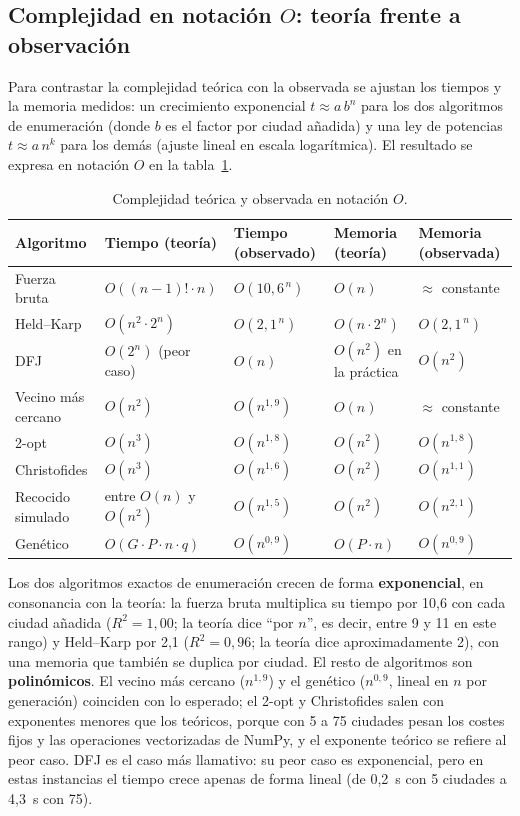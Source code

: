 \subsection{Complejidad en notación $O$: teoría frente a observación}

Para contrastar la complejidad teórica con la observada se ajustan los tiempos y la memoria medidos: un crecimiento exponencial $t\approx a\,b^{n}$ para los dos algoritmos de enumeración (donde $b$ es el factor por ciudad añadida) y una ley de potencias $t\approx a\,n^{k}$ para los demás
(ajuste lineal en escala logarítmica). El resultado se expresa en notación $O$ en la tabla~\ref{tab:bigo}.

\begin{table}[htbp]
  \centering
  \caption{Complejidad teórica y observada en notación $O$.}\label{tab:bigo}
  \footnotesize
  \begin{tabularx}{\linewidth}{@{}l X l X l@{}}
    \toprule
    Algoritmo & Tiempo (teoría) & Tiempo (observado) & Memoria (teoría) & Memoria (observada) \\
    \midrule
    Fuerza bruta & $O((n-1)!\cdot n)$ & $O(10{,}6^{\,n})$ & $O(n)$ & $\approx$ constante \\
    Held--Karp & $O(n^2\cdot 2^n)$ & $O(2{,}1^{\,n})$ & $O(n\cdot 2^n)$ & $O(2{,}1^{\,n})$ \\
    DFJ & $O(2^n)$ (peor caso) & $O(n)$ & $O(n^2)$ en la práctica & $O(n^{2})$ \\
    Vecino más cercano & $O(n^2)$ & $O(n^{1{,}9})$ & $O(n)$ & $\approx$ constante \\
    2-opt & $O(n^3)$ & $O(n^{1{,}8})$ & $O(n^2)$ & $O(n^{1{,}8})$ \\
    Christofides & $O(n^3)$ & $O(n^{1{,}6})$ & $O(n^2)$ & $O(n^{1{,}1})$ \\
    Recocido simulado & entre $O(n)$ y $O(n^2)$ & $O(n^{1{,}5})$ & $O(n^2)$ & $O(n^{2{,}1})$ \\
    Genético & $O(G\cdot P\cdot n\cdot q)$ & $O(n^{0{,}9})$ & $O(P\cdot n)$ & $O(n^{0{,}9})$ \\
    \bottomrule
  \end{tabularx}
\end{table}

Los dos algoritmos exactos de enumeración crecen de forma \textbf{exponencial}, en consonancia con la teoría: la fuerza bruta multiplica su tiempo por 10,6 con cada ciudad añadida ($R^2=1{,}00$; la teoría dice ``por $n$'', es decir, entre 9 y 11 en este rango) y Held--Karp por 2,1 ($R^2=0{,}96$; la
teoría dice aproximadamente 2), con una memoria que también se duplica por ciudad. El resto de algoritmos son \textbf{polinómicos}. El vecino más cercano ($n^{1,9}$) y el genético ($n^{0,9}$, lineal en $n$ por generación) coinciden con lo esperado; el 2-opt y Christofides salen con exponentes
menores que los teóricos, porque con 5 a 75 ciudades pesan los costes fijos y las operaciones vectorizadas de NumPy, y el exponente teórico se refiere al peor caso. DFJ es el caso más llamativo: su peor caso es exponencial, pero en estas instancias el tiempo crece apenas
de forma lineal (de 0,2~s con 5 ciudades a 4,3~s con 75).

